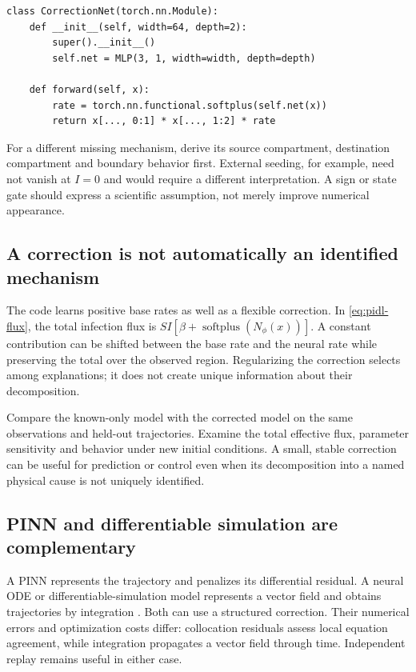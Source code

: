 \documentclass[11pt,a4paper]{article}
\theoremstyle{definition}
\theoremstyle{remark}
\begin{document}
\begin{lstlisting}[caption={The physical structure is visible in the correction}]
class CorrectionNet(torch.nn.Module):
    def __init__(self, width=64, depth=2):
        super().__init__()
        self.net = MLP(3, 1, width=width, depth=depth)

    def forward(self, x):
        rate = torch.nn.functional.softplus(self.net(x))
        return x[..., 0:1] * x[..., 1:2] * rate
\end{lstlisting}
For a different missing mechanism, derive its source compartment, destination compartment and boundary behavior first. External seeding, for example, need not vanish at $I=0$ and would require a different interpretation. A sign or state gate should express a scientific assumption, not merely improve numerical appearance.

\subsection{A correction is not automatically an identified mechanism}
The code learns positive base rates as well as a flexible correction. In \eqref{eq:pidl-flux}, the total infection flux is $SI[\beta+\operatorname{softplus}(N_\phi(x))]$. A constant contribution can be shifted between the base rate and the neural rate while preserving the total over the observed region. Regularizing the correction selects among explanations; it does not create unique information about their decomposition.

Compare the known-only model with the corrected model on the same observations and held-out trajectories. Examine the total effective flux, parameter sensitivity and behavior under new initial conditions. A small, stable correction can be useful for prediction or control even when its decomposition into a named physical cause is not uniquely identified.

\subsection{PINN and differentiable simulation are complementary}
A PINN represents the trajectory and penalizes its differential residual. A neural ODE or differentiable-simulation model represents a vector field and obtains trajectories by integration \cite{neuralode}. Both can use a structured correction. Their numerical errors and optimization costs differ: collocation residuals assess local equation agreement, while integration propagates a vector field through time. Independent replay remains useful in either case.
\end{document}
